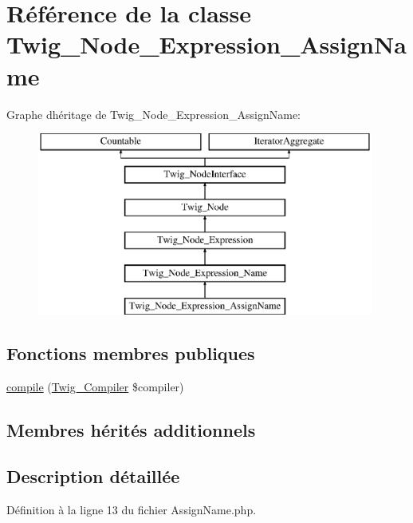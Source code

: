 \hypertarget{class_twig___node___expression___assign_name}{}\section{Référence de la classe Twig\+\_\+\+Node\+\_\+\+Expression\+\_\+\+Assign\+Name}
\label{class_twig___node___expression___assign_name}
Graphe d\textquotesingle{}héritage de Twig\+\_\+\+Node\+\_\+\+Expression\+\_\+\+Assign\+Name\+:\begin{figure}[H]
\begin{center}
\leavevmode
\includegraphics[height=6.000000cm]{class_twig___node___expression___assign_name}
\end{center}
\end{figure}
\subsection*{Fonctions membres publiques}
\begin{DoxyCompactItemize}
\item 
\hyperlink{class_twig___node___expression___assign_name_a4e0faa87c3fae583620b84d3607085da}{compile} (\hyperlink{class_twig___compiler}{Twig\+\_\+\+Compiler} \$compiler)
\end{DoxyCompactItemize}
\subsection*{Membres hérités additionnels}


\subsection{Description détaillée}


Définition à la ligne 13 du fichier Assign\+Name.\+php.



